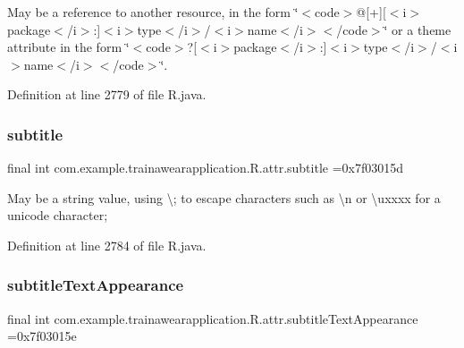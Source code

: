 May be a reference to another resource, in the form \char`\"{}$<$code$>$@\mbox{[}+\mbox{]}\mbox{[}$<$i$>$package$<$/i$>$\+:\mbox{]}$<$i$>$type$<$/i$>$/$<$i$>$name$<$/i$>$$<$/code$>$\char`\"{} or a theme attribute in the form \char`\"{}$<$code$>$?\mbox{[}$<$i$>$package$<$/i$>$\+:\mbox{]}$<$i$>$type$<$/i$>$/$<$i$>$name$<$/i$>$$<$/code$>$\char`\"{}. 

Definition at line 2779 of file R.\+java.

\mbox{\label{classcom_1_1example_1_1trainawearapplication_1_1_r_1_1attr_ae1ec416fcf580345415341ce8164f280}} 
\subsubsection{\texorpdfstring{subtitle}{subtitle}}
{\footnotesize\ttfamily final int com.\+example.\+trainawearapplication.\+R.\+attr.\+subtitle =0x7f03015d\hspace{0.3cm}{\ttfamily [static]}}

May be a string value, using \textquotesingle{}\textbackslash{};\textquotesingle{} to escape characters such as \textquotesingle{}\textbackslash{}n\textquotesingle{} or \textquotesingle{}\textbackslash{}uxxxx\textquotesingle{} for a unicode character; 

Definition at line 2784 of file R.\+java.

\mbox{\label{classcom_1_1example_1_1trainawearapplication_1_1_r_1_1attr_ab1508058707d05dedc414da835bb5bef}} 
\subsubsection{\texorpdfstring{subtitleTextAppearance}{subtitleTextAppearance}}
{\footnotesize\ttfamily final int com.\+example.\+trainawearapplication.\+R.\+attr.\+subtitle\+Text\+Appearance =0x7f03015e\hspace{0.3cm}{\ttfamily [static]}}

